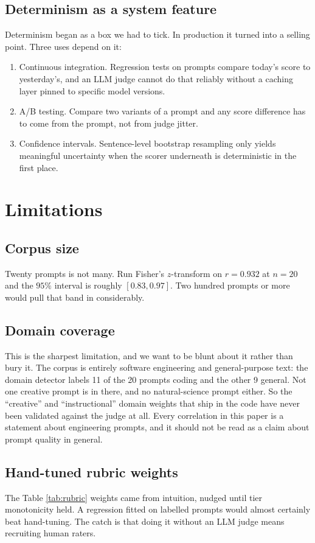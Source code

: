 \documentclass[conference]{IEEEtran}
\begin{document}
\subsection{Determinism as a system feature}
Determinism began as a box we had to tick. In production it turned into a selling point. Three uses depend on it:
\begin{enumerate}
\item Continuous integration. Regression tests on prompts compare today's score to yesterday's, and an LLM judge cannot do that reliably without a caching layer pinned to specific model versions.
\item A/B testing. Compare two variants of a prompt and any score difference has to come from the prompt, not from judge jitter.
\item Confidence intervals. Sentence-level bootstrap resampling only yields meaningful uncertainty when the scorer underneath is deterministic in the first place.
\end{enumerate}

\section{Limitations}
\label{sec:limitations}

\subsection{Corpus size}
Twenty prompts is not many. Run Fisher's $z$-transform on $r = 0.932$ at $n = 20$ and the $95\%$ interval is roughly $[0.83, 0.97]$. Two hundred prompts or more would pull that band in considerably.

\subsection{Domain coverage}
This is the sharpest limitation, and we want to be blunt about it rather than bury it. The corpus is entirely software engineering and general-purpose text: the domain detector labels 11 of the 20 prompts coding and the other 9 general. Not one creative prompt is in there, and no natural-science prompt either. So the ``creative'' and ``instructional'' domain weights that ship in the code have never been validated against the judge at all. Every correlation in this paper is a statement about engineering prompts, and it should not be read as a claim about prompt quality in general.

\subsection{Hand-tuned rubric weights}
The Table \ref{tab:rubric} weights came from intuition, nudged until tier monotonicity held. A regression fitted on labelled prompts would almost certainly beat hand-tuning. The catch is that doing it without an LLM judge means recruiting human raters.
\end{document}
